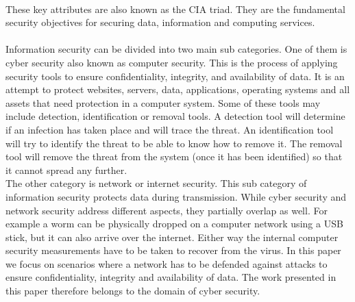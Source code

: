  ~~\\
 These key attributes are also known as the CIA triad. They are the fundamental security objectives for securing data, information and computing services. \\
 \\
Information security can be divided into two main sub categories. One of them is cyber security also known as computer security. This is the process of applying security tools to ensure confidentiality, integrity, and availability of data. It is an attempt to protect websites, servers, data, applications, operating systems and all assets that need protection in a computer system.  Some of these tools may include detection, identification or removal tools. A detection tool will determine if an infection has taken place and will trace the threat. An identification tool will try to identify the threat to be able to know how to remove it. The removal tool will remove the threat from the system (once it has been identified) so that it cannot spread any further. \\
The other category is network or internet security. This sub category of information security protects data during transmission. While cyber security and network security address different aspects, they partially overlap as well. For example a worm can be physically dropped on a computer network using a USB stick, but it can also arrive over the internet. Either way the internal computer security measurements have to be taken to recover from the virus. In this paper we focus on scenarios where a network has to be defended against attacks to ensure confidentiality, integrity and availability of data. The work presented in this paper therefore belongs to the domain of cyber security.




